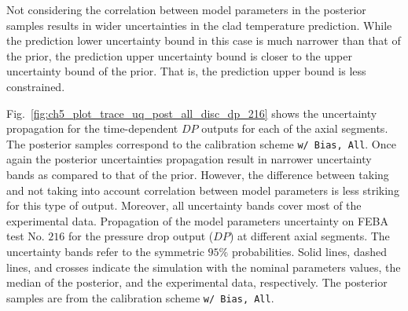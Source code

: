 Not considering the correlation between model parameters in the posterior samples results in wider uncertainties in the clad temperature prediction.
While the prediction lower uncertainty bound in this case is much narrower than that of the prior, the prediction upper uncertainty bound is closer to the upper uncertainty bound of the prior.
That is, the prediction upper bound is less constrained.

Fig.~\ref{fig:ch5_plot_trace_uq_post_all_disc_dp_216} shows the uncertainty propagation for the time-dependent $DP$ outputs for each of the axial segments.
The posterior samples correspond to the calibration scheme \texttt{w/ Bias, All}.
Once again the posterior uncertainties propagation result in narrower uncertainty bands as compared to that of the prior.
However, the difference between taking and not taking into account correlation between model parameters is less striking for this type of output.
Moreover, all uncertainty bands cover most of the experimental data.
{Propagation of the model parameters uncertainty on FEBA test No. $216$ for the pressure drop output ($DP$) at different axial segments. The uncertainty bands refer to the symmetric $95\%$ probabilities. Solid lines, dashed lines, and crosses indicate the simulation with the nominal parameters values, the median of the posterior, and the experimental data, respectively. The posterior samples are from the calibration scheme \texttt{w/ Bias, All}.}

